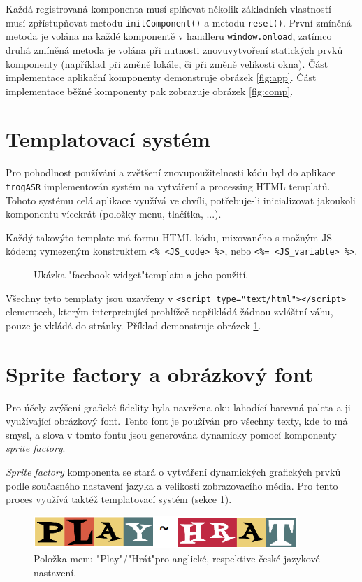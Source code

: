 Každá registrovaná komponenta musí splňovat několik základních vlastností -- musí zpřístupňovat metodu \verb|initComponent()| a metodu \verb|reset()|. První zmíněná metoda je volána na každé komponentě v handleru \verb|window.onload|, zatímco druhá zmíněná metoda je volána při nutnosti znovuvytvoření statických prvků komponenty (například při změně lokále, či při změně velikosti okna). Část implementace aplikační komponenty demonstruje obrázek \ref{fig:app}. Část implementace běžné komponenty pak zobrazuje obrázek \ref{fig:comp}.

\section{Templatovací systém}
\label{sec:template}

Pro pohodlnost používání a zvětšení znovupoužitelnosti kódu byl do aplikace \verb|trogASR| implementován systém na vytváření a processing HTML templatů. Tohoto systému celá aplikace využívá ve chvíli, potřebuje-li inicializovat jakoukoli komponentu vícekrát (položky menu, tlačítka, ...).

Každý takovýto template má formu HTML kódu, mixovaného s možným JS kódem; vymezeným konstruktem \verb|<% <JS_code> %>|, nebo \verb|<%= <JS_variable> %>|.
\\
\begin{figure}[h]
	
	\caption{Ukázka "facebook widget"\;templatu a jeho použití.}
	\label{fig:template}
\end{figure}

Všechny tyto templaty jsou uzavřeny v \verb|<script type="text/html"></script>| elementech, kterým interpretující prohlížeč nepřikládá žádnou zvláštní váhu, pouze je vkládá do stránky. Příklad demonstruje obrázek \ref{fig:template}.

\section{Sprite factory a obrázkový font}

Pro účely zvýšení grafické fidelity byla navržena oku lahodící barevná paleta a ji využívající obrázkový font. Tento font je používán pro všechny texty, kde to má smysl, a slova v tomto fontu jsou generována dynamicky pomocí komponenty {\sl sprite factory}.

{\sl Sprite factory} komponenta se stará o vytváření dynamických grafických prvků podle současného nastavení jazyka a velikosti zobrazovacího média. Pro tento proces využívá taktéž templatovací systém (sekce \ref{sec:template}).
\\
\begin{figure}[h]
	\includegraphics[width=100mm]{img/sprite.png}
	\caption{Položka menu "Play"/"Hrát"\;pro anglické, respektive české jazykové nastavení.}
	\label{fig:sprite}
\end{figure}

